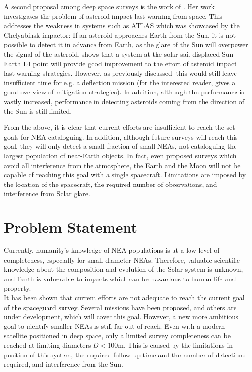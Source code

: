 A second proposal among deep space surveys is the work of \cite{ThesisOlga}. Her work investigates the problem of asteroid impact last warning from space. This addresses the weakness in systems such as ATLAS which was showcased by the Chelyabinsk impactor: If an asteroid approaches Earth from the Sun, it is not possible to detect it in advance from Earth, as the glare of the Sun will overpower the signal of the asteroid. \cite{ThesisOlga} shows that a system at the solar sail displaced Sun-Earth L1 point will provide good improvement to the effort of asteroid impact last warning strategies. However, as previously discussed, this would still leave insufficient time for e.g. a deflection mission (for the interested reader, \cite{DefendingEarth} gives a good overview of mitigation strategies). In addition, although the performance is vastly increased, performance in detecting asteroids coming from the direction of the Sun is still limited.

From the above, it is clear that current efforts are insufficient to reach the set goals for NEA cataloguing. In addition, although future surveys will reach this goal, they will only detect a small fraction of small NEAs, not cataloguing the largest population of near-Earth objects. In fact, even proposed surveys which avoid all interference from the atmosphere, the Earth and the Moon will not be capable of reaching this goal with a single spacecraft. Limitations are imposed by the location of the spacecraft, the required number of observations, and interference from Solar glare.



\section{Problem Statement}
Currently, humanity's knowledge of NEA populations is at a low level of completeness, especially for small diameter NEAs. Therefore, valuable scientific knowledge about the composition and evolution of the Solar system is unknown, and Earth is vulnerable to impacts which can be hazardous to human life and property. \\

It has been shown that current efforts are not adequate to reach the current goal of the spaceguard survey. Several missions have been proposed, and others are under development, which will cover this goal. However, a new more ambitious goal to identify smaller NEAs is still far out of reach. Even with a modern satellite positioned in deep space, only a limited survey completeness can be reached at limiting diameters $D < 100 \mathrm{m}$. This is caused by the limitations in position of this system, the required follow-up time and the number of detections required, and interference from the Sun.


